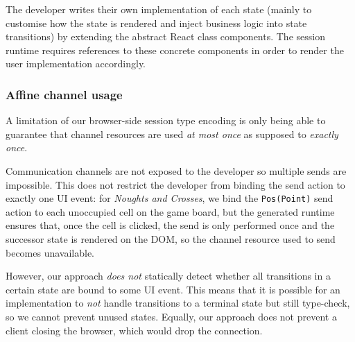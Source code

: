 The developer writes their own implementation of each state (mainly to
customise how the state is rendered and inject business logic into state
transitions) by extending the abstract React class components.
The session runtime requires references to these concrete components in order to
render the user implementation accordingly.

\subsubsection{Affine channel usage}
A limitation of our browser-side session type encoding is only being able to
guarantee that channel resources are used \textit{at most once} as supposed to
\textit{exactly once}.

Communication channels are not exposed to the developer so multiple sends are
impossible.
This does not restrict the developer from binding the send action to exactly
one UI event: for \textit{Noughts and Crosses}, we bind the \texttt{Pos(Point)}
send action to each unoccupied cell on the game board, but the generated
runtime ensures that, once the cell is clicked, the send is only performed once
and the successor state is rendered on the DOM, so the channel resource used to
send becomes unavailable.

However, our approach \textit{does not} statically detect whether all
transitions in a certain state are bound to some UI event.
This means that it is possible for an implementation to \textit{not} handle
transitions to a terminal state but still type-check, so we cannot prevent
unused states. Equally, our approach does not prevent a client closing the browser, which would drop the connection.
